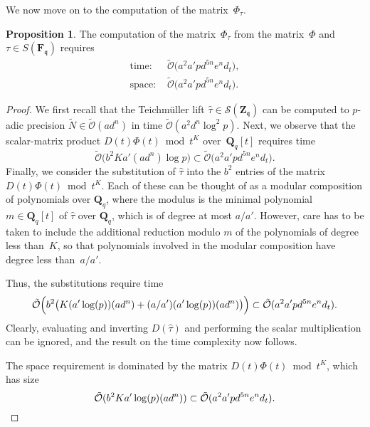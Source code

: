 \documentclass[a4paper,11pt]{article}
\numberwithin{equation}{section}
\newcommand{\ZZ}{\mathbf{Z}} %
\newcommand{\QQ}{\mathbf{Q}} %
\newcommand{\FF}{\mathbf{F}} %
\providecommand{\SoftOh}{\tilde{\mathcal{O}}} %
\theoremstyle{definition}
\newtheorem{prop}[thm]{Proposition}
\begin{document}
We now move on to the computation of the matrix~$\Phi_{\tau}$.

\begin{prop}
The computation of the matrix~$\Phi_{\tau}$ from the matrix~$\Phi$ 
and $\tau \in S(\FF_{\mathfrak{q}})$ requires
\begin{align*}
\mbox{time: }  &\SoftOh\bigl(a^2 a' p d^{5n} e^n d_t \bigr), \\ 
\mbox{space: } &\SoftOh\bigl(a^2 a' p d^{5n} e^n d_t \bigr).
\end{align*}
\end{prop}

\begin{proof}
We first recall that the Teichm\"uller lift 
$\hat{\tau} \in \mathcal{S}(\ZZ_{\mathfrak{q}})$ 
can be computed to $p$-adic precision $\tilde{N} \in \SoftOh(a d^n)$ 
in time $\SoftOh(a^2 d^n \log^2 p)$.  Next, we observe that the 
scalar-matrix product $D(t) \Phi(t) \bmod t^K$ over~$\QQ_q[t]$ 
requires time 
\begin{equation*}
\SoftOh\bigl( b^2 K a' (a d^n) \log p \bigr) 
    \subset \SoftOh\bigl( a^2 a' p d^{5n} e^n d_t \bigr).
\end{equation*}
Finally, we consider the substitution of $\hat{\tau}$ 
into the $b^2$ entries of the matrix $D(t) \Phi(t) \bmod t^K$. 
Each of these can be thought of as a modular composition of polynomials over 
$\QQ_{q}$, where the modulus is the minimal polynomial $m \in \QQ_q[t]$ of 
$\hat{\tau}$ over $\QQ_{q}$, which is of degree at most $a/a'$. However, 
care has to be taken to include the additional reduction modulo $m$ 
of the polynomials of degree less than~$K$, so that polynomials 
involved in the modular composition have degree less than~$a/a'$. 

Thus, the substitutions require time 
\begin{equation*}
\SoftOh\Bigl( b^2 \bigl(K (a' \log(p)) (a d^n) + (a/a') (a' \log(p)) (a d^n) \bigr) \Bigr)
    \subset \SoftOh(a^2 a' p d^{5n} e^n d_t).
\end{equation*}
Clearly, evaluating and inverting $D(\hat{\tau})$ and performing the 
scalar multiplication can be ignored, and the result on the time complexity now follows.

The space requirement is dominated by the matrix $D(t)\Phi(t) \bmod t^K$, 
which has size 
\begin{equation*}
\SoftOh(b^2 K a' \log(p) (a d^n)) \subset \SoftOh(a^2 a' p d^{5n} e^n d_t). 
\qedhere
\end{equation*}
\end{proof}
\end{document}
